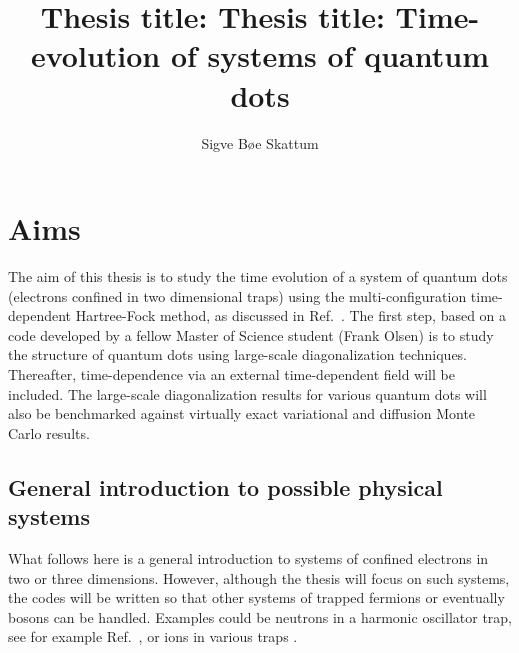 \documentclass[twocolumn]{revtex4}
\begin{document}
\title{Thesis title: Thesis title: Time-evolution of  systems of quantum dots}
\author{Sigve B\o e Skattum}
\maketitle
\section*{Aims}
The aim of this thesis is to study the time evolution of a system of quantum dots (electrons confined in
two dimensional traps) using the multi-configuration time-dependent Hartree-Fock method, as discussed in Ref.~\cite{mcthf}. The first step, based on a code developed by a fellow Master of Science student (Frank Olsen) is to 
study the structure of quantum dots using large-scale diagonalization techniques. Thereafter, time-dependence via an external time-dependent field will be included.
The large-scale diagonalization results for various quantum dots will also be benchmarked against
virtually exact variational and diffusion Monte Carlo results.
\subsection*{General introduction to possible physical systems}




What follows here is a general introduction to systems of confined electrons in two or three dimensions.
However, although the thesis will focus on such systems, the codes will be written so 
that other systems of trapped 
fermions or eventually bosons can be handled. Examples could be neutrons in a harmonic oscillator trap, see for example Ref.~\cite{bogner2011}, or ions in various traps \cite{yoram2008}.  
\end{document}
